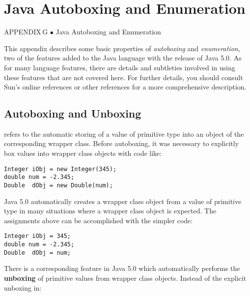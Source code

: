 \setcounter{table}{0}
\setcounter{figure}{0}
\renewcommand{\thetable}{\mbox{G.\arabic{table}}}%
\renewcommand{\thefigure}{\mbox{G--\arabic{figure}}}%

\chapter{Java Autoboxing and Enumeration}

{{\color{cyan}APPENDIX\,G\,\,$\bullet$\,\,}Java Autoboxing and Enumeration}

\noindent This appendix describes some basic properties of {\em autoboxing}
and {\em enumeration}, two of the features added to the Java language
with the release of Java 5.0.  As for many language features, there
are details and subtleties involved in using these features that are
not covered here.  For further details, you should consult Sun's
online references or other references for a more comprehensive
description.

\section*{Autoboxing and Unboxing}
\label{autoboxingand-unboxing}
 refers to the automatic storing of a value
of primitive type into an object of the corresponding wrapper class.
Before autoboxing, it was necessary to explicitly box values into wrapper 
class objects with code like:

\begin{jjjlisting}
\begin{lstlisting}
Integer iObj = new Integer(345);
double num = -2.345;
Double  dObj = new Double(num);
\end{lstlisting}
\end{jjjlisting}

\noindent Java 5.0 automatically creates a wrapper class object from a
value of primitive type in many situations where a wrapper class object
is expected.  The assignments above can be accomplished with the simpler code:

\begin{jjjlisting}
\begin{lstlisting}
Integer iObj = 345;
double num = -2.345;
Double  dObj = num;
\end{lstlisting}
\end{jjjlisting}

There is a corresponding feature in Java 5.0 which automatically performs 
the {\bf unboxing} of primitive values from wrapper class objects.
Instead of the explicit unboxing in:

